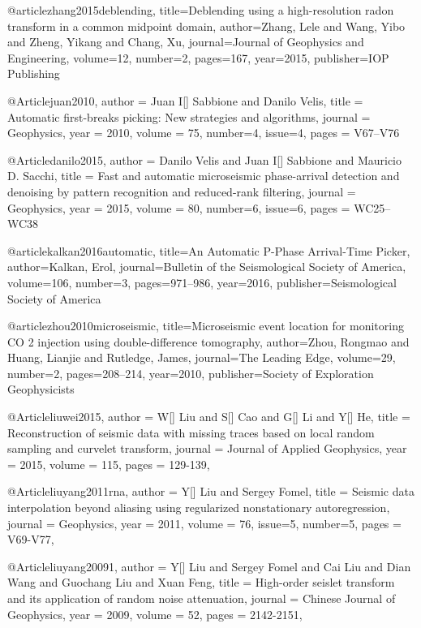   @article{zhang2015deblending,
  title={Deblending using a high-resolution radon transform in a common midpoint domain},
  author={Zhang, Lele and Wang, Yibo and Zheng, Yikang and Chang, Xu},
  journal={Journal of Geophysics and Engineering},
  volume={12},
  number={2},
  pages={167},
  year={2015},
  publisher={IOP Publishing}
}

    @Article{juan2010,
  author = 	 {Juan I[] Sabbione and Danilo Velis},
  title = 	 {Automatic first-breaks picking: New strategies and algorithms},
  journal = 	 {Geophysics},
  year = 	 2010,
  volume = 	 75,
  number=4,
  issue=4,
  pages = 	 {V67–V76}} 
  
      @Article{danilo2015,
  author = 	 {Danilo Velis and Juan I[] Sabbione and Mauricio D. Sacchi},
  title = 	 {Fast and automatic microseismic phase-arrival detection and denoising by pattern recognition and reduced-rank filtering},
  journal = 	 {Geophysics},
  year = 	 2015,
  volume = 	 80,
  number=6,
  issue=6,
  pages = 	 {WC25–WC38}} 
  
@article{kalkan2016automatic,
  title={An Automatic P-Phase Arrival-Time Picker},
  author={Kalkan, Erol},
  journal={Bulletin of the Seismological Society of America},
  volume={106},
  number={3},
  pages={971--986},
  year={2016},
  publisher={Seismological Society of America}
}

@article{zhou2010microseismic,
  title={Microseismic event location for monitoring CO 2 injection using double-difference tomography},
  author={Zhou, Rongmao and Huang, Lianjie and Rutledge, James},
  journal={The Leading Edge},
  volume={29},
  number={2},
  pages={208--214},
  year={2010},
  publisher={Society of Exploration Geophysicists}
}
  
@Article{liuwei2015,
  author = 	 {W[] Liu and S[] Cao and G[] Li and Y[] He},
  title = 	 {Reconstruction of seismic data with missing traces based on local random sampling and curvelet transform},
  journal = 	 {Journal of Applied Geophysics},
  year = 	 2015,
  volume = 115,
  pages =	 {129-139},
}

@Article{liuyang2011rna,
  author = 	 {Y[] Liu and Sergey Fomel},
  title = 	 {Seismic data interpolation beyond aliasing using regularized nonstationary autoregression},
  journal = 	 {Geophysics},
  year = 	 2011,
  volume =	 76,
  issue=5,
  number=5,
  pages =	 {V69-V77},
}

@Article{liuyang20091,
  author = 	 {Y[] Liu and Sergey Fomel and Cai Liu and Dian Wang and Guochang Liu and Xuan Feng},
  title = 	 {High-order seislet transform and its application of random noise attenuation},
  journal = 	 {Chinese Journal of Geophysics},
  year = 	 2009,
  volume =	 52,
  pages =	 {2142-2151},
}


